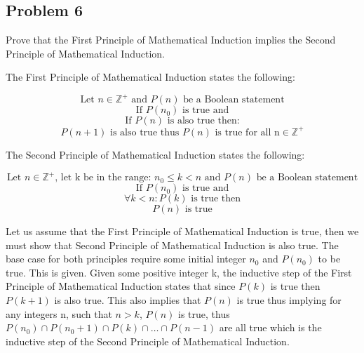 \documentclass{article}
\begin{document}
\subsection{Problem 6}
Prove that the First Principle of Mathematical Induction implies the Second Principle of Mathematical Induction.

The First Principle of Mathematical Induction states the following:

$$\text{Let } n \in \mathbb{Z}^+ \text{ and } P(n) \text{ be a Boolean statement}$$
$$\text{If } P(n_0) \text{ is true and}$$
$$\text{If } P(n) \text{ is also true then:}$$
$$P(n + 1) \text{ is also true thus } P(n) \text{ is true for all n} \in \mathbb{Z}^+$$

The Second Principle of Mathematical Induction states the following:

$$\text{Let } n \in \mathbb{Z}^+ \text{, let k be in the range: } n_0 \le k < n \text{ and } P(n) \text{ be a Boolean statement} $$
$$\text{If } P(n_0) \text{ is true and}$$
$$\forall k < n:  P(k) \text{ is true then}$$
$$P(n) \text{ is true}$$

Let us assume that the First Principle of Mathematical Induction is true, then we must show that Second Principle of Mathematical Induction is also true. The base case for both principles require some initial integer $n_0$ and $P(n_0)$ to be true. This is given. Given some positive integer k, the inductive step of the First Principle of Mathematical Induction states that since $P(k)$ is true then $P(k+1)$ is also true. This also implies that $P(n)$ is true thus implying for any integers n, such that $n > k$, $P(n)$ is true, thus $P(n_0) \cap P(n_0 + 1) \cap P(k) \cap \dots \cap P(n-1)$ are all true which is the inductive step of the Second Principle of Mathematical Induction.
\end{document}
